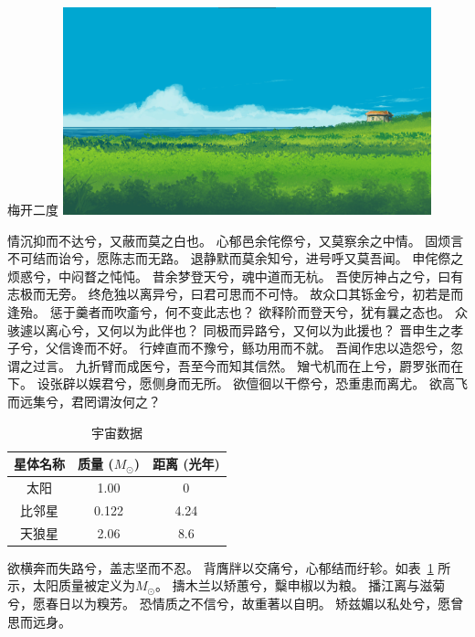 \begin{customfigure}{梅开二度}
	\includegraphics[width=0.8\textwidth]{figures/test2.png} %
\end{customfigure}

情沉抑而不达兮，又蔽而莫之白也。
心郁邑余侘傺兮，又莫察余之中情。
固烦言不可结而诒兮，愿陈志而无路。
退静默而莫余知兮，进号呼又莫吾闻。
申侘傺之烦惑兮，中闷瞀之忳忳。
昔余梦登天兮，魂中道而无杭。
吾使厉神占之兮，曰有志极而无旁。
终危独以离异兮，曰君可思而不可恃。
故众口其铄金兮，初若是而逢殆。
惩于羹者而吹齑兮，何不变此志也？
欲释阶而登天兮，犹有曩之态也。
众骇遽以离心兮，又何以为此伴也？
同极而异路兮，又何以为此援也？\cite{soares2025,zhang2025,ZhaoYaQi2025}
晋申生之孝子兮，父信谗而不好。
行婞直而不豫兮，鲧功用而不就。
吾闻作忠以造怨兮，忽谓之过言。
九折臂而成医兮，吾至今而知其信然。
矰弋机而在上兮，罻罗张而在下。
设张辟以娱君兮，愿侧身而无所。
欲儃徊以干傺兮，恐重患而离尤。
欲高飞而远集兮，君罔谓汝何之？

\begin{table}[htbp]  %
	\centering
	\caption{宇宙数据}  %
	\label{tab:universe}  %
	
	\begin{tabular}{ccc}  %
		\toprule   %
		星体名称 & 质量 ($M_\odot$) & 距离 (光年) \\  %
		\midrule  %
		太阳 & 1.00 & 0 \\
		比邻星 & 0.122 & 4.24 \\
		天狼星 & 2.06 & 8.6 \\
		\bottomrule  %
	\end{tabular}
\end{table}


欲横奔而失路兮，盖志坚而不忍。
背膺牉以交痛兮，心郁结而纡轸。如表~\ref{tab:universe} 所示，太阳质量被定义为\begin{math}M_\odot\end{math}。
擣木兰以矫蕙兮，糳申椒以为粮。
播江离与滋菊兮，愿春日以为糗芳。
恐情质之不信兮，故重著以自明。
矫兹媚以私处兮，愿曾思而远身。

